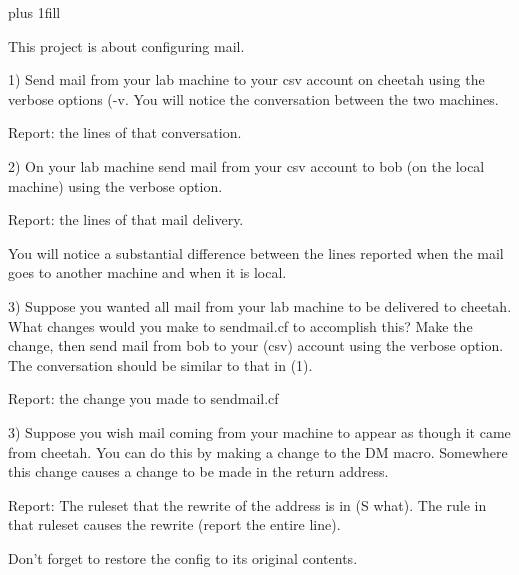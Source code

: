 
\rightskip=0pt plus 1fill

\parindent 0pt

This project is about configuring mail.

1) Send mail from your lab machine to your csv account on {\ltt{}cheetah}
using the verbose options ({\ltt{}-v}.
You will notice the conversation between the two machines.

Report: the lines of that conversation.

2) On your lab machine send mail from your csv account to bob (on the
local machine) using the verbose option.

Report: the lines of that mail delivery.

You will notice a substantial difference between the lines reported
when the mail goes to another machine and when it is local.

3) Suppose you wanted all mail from your lab machine to be delivered 
to cheetah.
What changes would you make to {\ltt{}sendmail.cf} to accomplish this?
Make the change, then send mail from bob to your (csv) account
using the verbose option.
The conversation should be similar to that in (1).

Report: the change you made to {\ltt{}sendmail.cf}

3) Suppose you wish mail coming from your machine to appear as though it
came from cheetah.
You can do this by making a change to the {\ltt{}DM} macro.
Somewhere this change causes a change to be made in the return address.

Report: The ruleset that the rewrite of the address is in (S what).
The rule in that ruleset causes the rewrite (report the entire line).

Don't forget to restore the config to its original contents.
\bye
